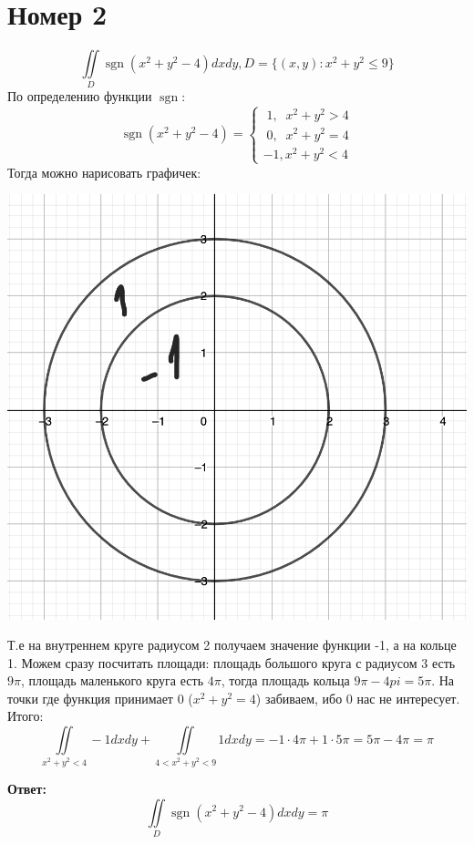 \documentclass[a4paper,12pt]{article}
\DeclareMathOperator{\sgn}{\mathop{sgn}}
\begin{document}
\section*{Номер 2}
\[
\iint\limits_D \sgn(x^2 + y^2 -4)dxdy, D = \{(x, y) : x^2 + y^2 \leq 9 \}
\]
По определению функции $\sgn$:
\[
 \sgn(x^2 + y^2 -4) = \begin{cases}
\;1,\;\; x^2 + y^2 > 4 \\
\; 0,\; \;x^2 + y^2 = 4\\
-1 , x^2 + y^2 < 4
\end{cases}
\]
Тогда можно нарисовать графичек:
\begin{center}
\includegraphics[scale=0.4]{2.png}
\end{center}
Т.е на внутреннем круге радиусом 2 получаем значение функции -1, а на кольце 1. Можем сразу посчитать площади: площадь большого круга с радиусом 3 есть $9 \pi$, площадь маленького круга есть $4 \pi$, тогда площадь кольца $9 \pi - 4pi  = 5\pi$. На точки где функция принимает 0 ($x^2 + y^2 = 4$) забиваем, ибо 0 нас не интересует. Итого:
\[
\iint\limits_{x^2 + y^2 < 4} -1 dx dy + \iint\limits_{4 < x^2 + y^2 < 9} 1 dx dy = -1 \cdot 4\pi +1 \cdot 5 \pi = 5 \pi - 4\pi = \pi
\]
\begin{center}
\textbf{Ответ: } 
\[
\iint\limits_D \sgn(x^2 + y^2 -4)dxdy = \pi
\]
\end{center}
\end{document}

